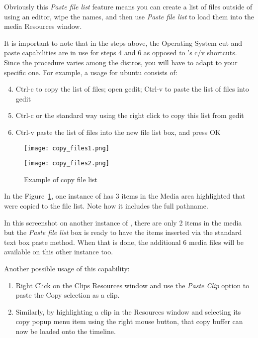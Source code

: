 Obviously this \textit{Paste file list} feature means you can create a list of files outside of \CGG{} using an editor, wipe the names, and then use \textit{Paste file list} to load them into the media Resources window.  

It is important to note that in the steps above, the Operating System cut and paste capabilities are in use for steps 4 and 6 as opposed to \CGG{}’s c/v shortcuts.  
Since the procedure varies among the distros, you will have to adapt to your specific one.  For example, a usage for ubuntu consists of:
\begin{enumerate}
    \setcounter{enumi}{3}
    \item   Ctrl-c to copy the list of files; open gedit; Ctrl-v to paste the list of files into gedit
    \item   Ctrl-c or the standard way using the right click to copy this list from gedit
    \item Ctrl-v paste the list of files into the new file list box, and press OK
\end{enumerate}

\begin{figure}[htpb]
    \centering
    \begin{minipage}{.9\linewidth}
    \centering
        \texttt{[image: copy\_files1.png]}
    \end{minipage}
    \vfill
    \begin{minipage}{.5\linewidth}
    \centering
        \texttt{[image: copy\_files2.png]}
    \end{minipage}
    \caption{Example of copy file list}
    \label{fig:copy_files1}
\end{figure}

In the Figure~\ref{fig:copy_files1}, one instance of \CGG{} has 3 items in the Media area highlighted that were copied to the file list.  
Note how it includes the full pathname.

In this screenshot on another instance of \CGG{}, there are only 2 items in the media but the \textit{Paste file list} box is ready to have the items inserted via the standard text box paste method.  When that is done, the additional 6 media files will be available on this other instance too.


Another possible usage of this capability:

\begin{enumerate}
    \item  Right Click on the Clips Resources window and use the \textit{Paste Clip} option to paste the Copy selection as a clip.  
    \item  Similarly, by highlighting a clip in the Resources window and selecting its copy popup menu item using the right mouse button, that copy buffer can now be loaded onto the timeline.
\end{enumerate}


